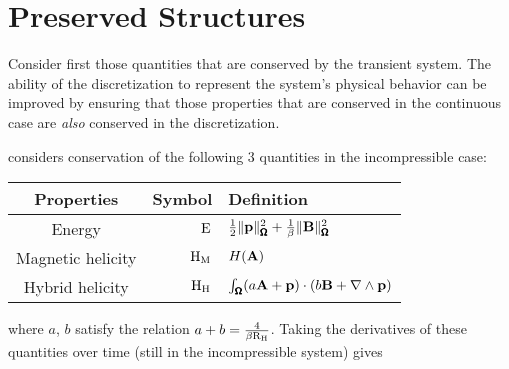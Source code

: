 \section{Preserved Structures}
    
    Consider first those quantities that are conserved by the transient system. The ability of the discretization to represent the system's physical behavior can be improved by ensuring that those properties that are conserved in the continuous case are \emph{also} conserved in the discretization. \BA{[Ref, ...]}
    
    \cite{LHF22} considers conservation of the following 3 quantities in the incompressible case: 
    \begin{center}\begin{tabular}{ c | r l }
        Properties  &  Symbol  &  Definition  \\
        \hline\hline
        Energy  &  $\mathrm{E}$  &  $\frac{1}{2}\|\mathbf{p}\|_{\pmb{\mathsf{\Omega}}}^{2} + \frac{1}{\beta}\|\mathbf{B}\|_{\pmb{\mathsf{\Omega}}}^{2}$  \\
        Magnetic helicity  &  $\mathrm{H}_{\mathrm{M}}$  &  $H(\mathbf{A})$  \\
        Hybrid helicity  &  $\mathrm{H}_{\mathrm{H}}$  &  $\int_{\pmb{\mathsf{\Omega}}}(a\mathbf{A} + \mathbf{p})\cdot(b\mathbf{B} + \nabla\wedge\mathbf{p})$
    \end{tabular}\end{center}
    where $a$, $b$ satisfy the relation $a + b  =  \frac{4}{\beta\mathrm{R}_{\mathrm{H}}}$.  Taking the derivatives of these quantities over time (still in the incompressible system) gives 
